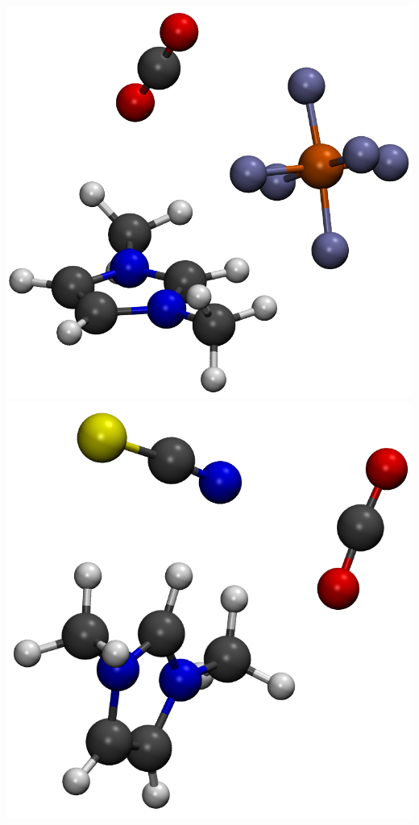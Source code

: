\documentclass{beamer}
\begin{document}
\begin{frame}
  \includegraphics[scale=0.08]{./figures/cluster_PF6.png}
  \includegraphics[scale=0.08]{./figures/cluster_SCN.png}

\end{frame}
\end{document}
